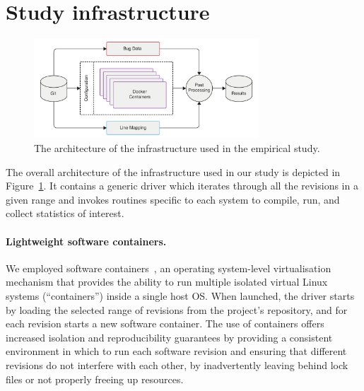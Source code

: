 \section{Study infrastructure}
\label{sec:design}

\begin{figure}[t!]
\centering
\includegraphics[width=0.75\textwidth]{evolution/figures/pipeline}
\caption{The architecture of the infrastructure used in the empirical study.}
\label{fig:arch}
\end{figure}

The overall architecture of the infrastructure used in our study is depicted in
Figure~\ref{fig:arch}.  It contains a generic driver which iterates through all
the revisions in a given range and invokes routines specific to each system to
compile, run, and collect statistics of interest.



\paragraph{Lightweight software containers.} We employed software
containers~\cite{containers:eurosys07}, an operating system-level
virtualisation mechanism that provides the ability to run multiple isolated
virtual Linux systems (``containers'') inside a single host OS.  When launched,
the driver starts by loading the selected range of revisions from the project's
\git repository, and for each revision starts a new software container.  The
use of containers offers increased isolation and reproducibility guarantees by
providing a consistent environment in which to run each software revision and
ensuring that different revisions do not interfere with each other, \eg by
inadvertently leaving behind lock files or not properly freeing up resources.

